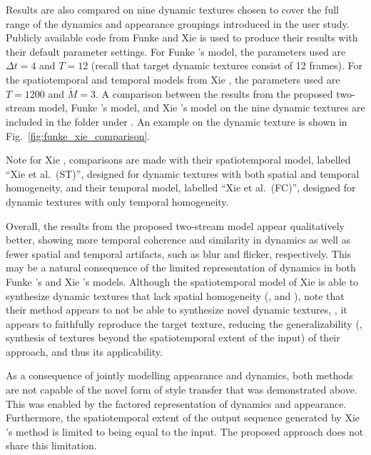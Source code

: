 \clearpage

\clearpage

Results are also compared on nine dynamic textures chosen to cover the full
range of the dynamics and appearance groupings introduced in the user study.
Publicly available code from Funke \etal and Xie \etal is used to produce their
results with their default parameter settings. For
Funke \etal's model, the parameters used are $\Delta{t}=4$ and
$T=12$ (recall that target dynamic textures
consist of 12 frames). For the spatiotemporal and temporal models from Xie
\etal, the parameters used are $T=1200$ and
$\tilde{M}=3$.
A comparison between the results from the proposed two-stream model, Funke
\etal's model, and Xie \etal's model
on the nine dynamic textures are included in the folder 
under . An example on the  dynamic texture is shown in Fig.\ \ref{fig:funke_xie_comparison}.

Note for Xie \etal, comparisons are made with their
spatiotemporal model, labelled ``Xie et al.\ (ST)'', designed for dynamic
textures with both spatial and temporal homogeneity, and their temporal model,
labelled ``Xie et al.\ (FC)'', designed for dynamic textures with only temporal
homogeneity.

\clearpage

\clearpage

Overall, the results from the proposed two-stream model appear
qualitatively better, showing more temporal coherence and similarity
in dynamics as well as fewer spatial and temporal artifacts, such as blur and flicker, respectively.
This may be a natural consequence of the limited representation of dynamics
in both Funke \etal's and Xie \etal's models. Although the spatiotemporal model
of Xie \etal \cite{xie2017synthesizing} is able to synthesize dynamic textures
that lack spatial homogeneity (\eg,  and ),
note that their method appears to not be able to synthesize novel dynamic textures, \ie, it
appears to faithfully reproduce the target texture, reducing the generalizability (\eg, synthesis of textures beyond the spatiotemporal extent of the input) of their approach, and thus its applicability.
 
As a consequence of jointly modelling appearance and dynamics, both methods \cite{funke2017,xie2017synthesizing} are not capable of the novel form of style
transfer that was demonstrated above. This  was enabled by the factored
representation of dynamics and appearance. Furthermore, the spatiotemporal
extent of the output sequence generated by Xie \etal's
\cite{xie2017synthesizing} method is limited to being equal to the input.
The proposed approach does not share this limitation.

